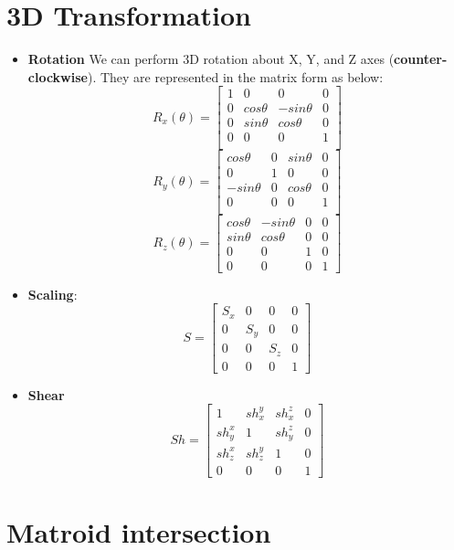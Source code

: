 \documentclass[11pt]{article}
\begin{document}
\begin{multicols}{3}
\section{3D Transformation}
\begin{itemize}
    \item \textbf{Rotation} We can perform 3D rotation about X, Y, and Z axes (\textbf{counter-clockwise}). They are represented in the matrix form as below:
    $$ R_{x}(\theta) = \begin{bmatrix}
 1& 0&  0& 0\\ 
 0&  cos\theta & -sin\theta& 0\\ 
 0&  sin\theta &  cos\theta& 0\\ 
 0& 0&  0& 1\\
\end{bmatrix}$$
$$R_{y}(\theta) = \begin{bmatrix}
 cos\theta& 0&  sin\theta& 0\\ 
 0&  1& 0& 0\\ 
 -sin\theta&  0&  cos\theta& 0\\ 
 0& 0&  0& 1\\
\end{bmatrix}$$
$$R_{z}(\theta) =\begin{bmatrix}
 cos\theta &  -sin\theta &  0& 0\\ 
 sin\theta &  cos\theta &  0& 0\\ 
 0& 0&  1& 0\\ 
 0&  0&  0& 1
\end{bmatrix}$$
    \item \textbf{Scaling}:
    $$ S = \begin{bmatrix}
 S_{x}&  0&  0& 0\\ 
 0&  S_{y}&  0& 0\\ 
 0& 0&  S_{z}& 0\\ 
 0&  0&  0& 1
\end{bmatrix}$$
    \item \textbf{Shear}
    $$Sh = \begin{bmatrix}
1 & sh_{x}^{y}  & sh_{x}^{z}  & 0 \\ 
sh_{y}^{x} & 1  & sh_{y}^{z}  & 0 \\ 
sh_{z}^{x} & sh_{z}^{y} & 1  & 0 \\ 
0 & 0 & 0 & 1 
\end{bmatrix}$$
\end{itemize}

\section{Matroid intersection}


\end{multicols}
\end{document}
